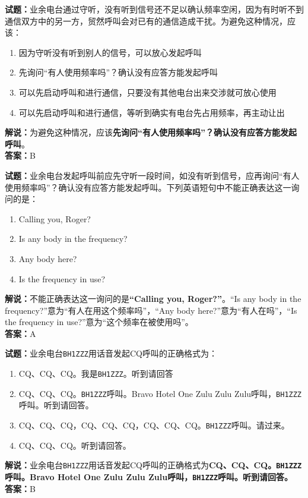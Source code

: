 \documentclass{ctexbook}
\begin{document}
\vspace{\baselineskip}

\noindent\textbf{试题：}业余电台通过守听，没有听到信号还不足以确认频率空闲，因为有时听不到通信双方中的另一方，贸然呼叫会对已有的通信造成干扰。为避免这种情况，应该：
\begin{enumerate}[leftmargin=3em]
  \item 因为守听没有听到别人的信号，可以放心发起呼叫
  \item 先询问“有人使用频率吗”？确认没有应答方能发起呼叫
  \item 可以先启动呼叫和进行通信，只要没有其他电台出来交涉就可放心使用
  \item 可以先启动呼叫和进行通信，等听到确实有电台先占用频率，再主动让出
\end{enumerate}
\noindent\textbf{解说：}为避免这种情况，应该\textbf{先询问“有人使用频率吗”？确认没有应答方能发起呼叫}。\\\noindent\textbf{答案：}B

\vspace{\baselineskip}

\noindent\textbf{试题：}业余电台发起呼叫前应先守听一段时间，如没有听到信号，应再询问“有人使用频率吗”？确认没有应答方能发起呼叫。下列英语短句中不能正确表达这一询问的是：
\begin{enumerate}[leftmargin=3em]
  \item Calling you, Roger?
  \item Is any body in the frequency?
  \item Any body here?
  \item Is the frequency in use?
\end{enumerate}
\noindent\textbf{解说：}不能正确表达这一询问的是\textbf{“Calling you, Roger?”}。“Is any body in the frequency?”意为“有人在用这个频率吗”，“Any body here?”意为“有人在吗”，“Is the frequency in use?”意为“这个频率在被使用吗”。\\
\noindent\textbf{答案：}A

\vspace{\baselineskip}

\noindent\textbf{试题：}业余电台\texttt{BH1ZZZ}用话音发起CQ呼叫的正确格式为：
\begin{enumerate}[leftmargin=3em]
  \item CQ、CQ、CQ。我是\texttt{BH1ZZZ}。听到请回答
  \item CQ、CQ、CQ。\texttt{BH1ZZZ}呼叫。Bravo Hotel One Zulu Zulu Zulu呼叫，\texttt{BH1ZZZ}呼叫。听到请回答。
  \item CQ、CQ、CQ，CQ、CQ、CQ，CQ、CQ、CQ。\texttt{BH1ZZZ}呼叫。请过来。
  \item CQ、CQ、CQ。听到请回答。
\end{enumerate}
\noindent\textbf{解说：}业余电台\texttt{BH1ZZZ}用话音发起CQ呼叫的正确格式为\textbf{CQ、CQ、CQ。\texttt{BH1ZZZ}呼叫。Bravo Hotel One Zulu Zulu Zulu呼叫，\texttt{BH1ZZZ}呼叫。听到请回答。}\\
\noindent\textbf{答案：}B
\end{document}
